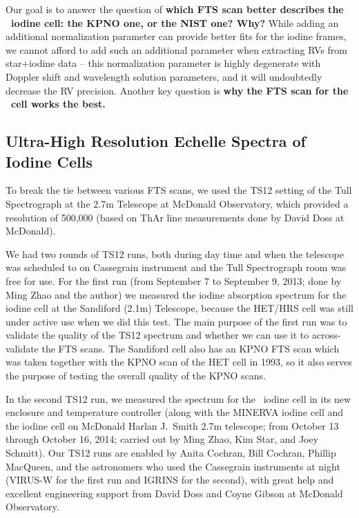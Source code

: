 Our goal is to answer the question of {\bf which FTS scan better describes
the \het\ iodine cell: the KPNO one, or the NIST one? Why?} While adding an
additional normalization parameter can provide better fits for the
iodine frames, we cannot afford to add such an additional parameter
when extracting RVs from star$+$iodine data -- this normalization
parameter is highly degenerate with Doppler shift and wavelength
solution parameters, and it will undoubtedly decrease the RV
precision. Another key question is {\bf why the FTS scan for the \keck\
cell works the best.}


\subsection{Ultra-High Resolution Echelle Spectra of Iodine Cells}

To break the tie between various FTS scans, we used the TS12 setting
of the Tull Spectrograph at the 2.7m Telescope at McDonald
Observatory, which provided a resolution of 500,000 (based on ThAr
line measurements done by David Doss at McDonald). 

We had two rounds of TS12 runs, both during day time and when the
telescope was scheduled to on Cassegrain instrument and the Tull
Spectrograph room was free for use. For the first run (from September
7 to September 9, 2013; done by Ming Zhao and the author) we measured
the iodine absorption spectrum for the iodine cell at the Sandiford
(2.1m) Telescope, because the HET/HRS cell was still under active use
when we did this test. The main purpose of the first run was to
validate the quality of the TS12 spectrum and whether we can use it to
across-validate the FTS scans. The Sandiford cell also has an KPNO FTS
scan which was taken together with the KPNO scan of the HET cell in
1993, so it also serves the purpose of testing the overall quality of
the KPNO scans.

In the second TS12 run, we measured the spectrum for the \het\ iodine
cell in its new enclosure and temperature controller (along with the
MINERVA iodine cell and the iodine cell on McDonald Harlan J.\ Smith
2.7m telescope; from October 13 through October 16, 2014; carried out
by Ming Zhao, Kim Star, and Joey Schmitt). Our TS12 runs are enabled
by Anita Cochran, Bill Cochran, Phillip MacQueen, and the astronomers
who used the Cassegrain instruments at night (VIRUS-W for the first
run and IGRINS for the second), with great help and excellent
engineering support from David Doss and Coyne Gibson at McDonald
Observatory.


